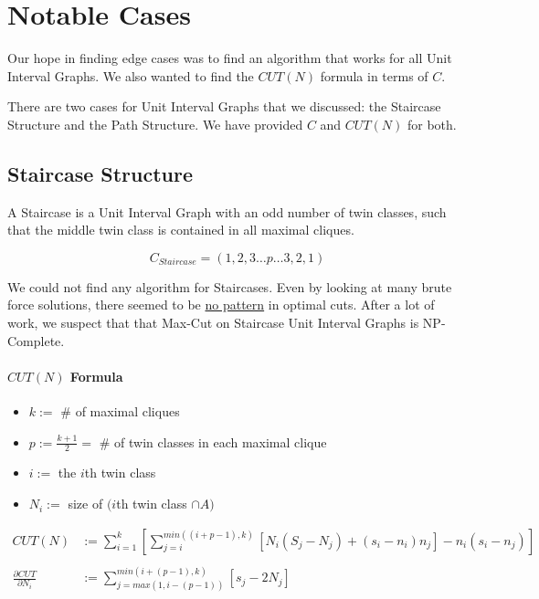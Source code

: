 \documentclass[12pt]{article}
\begin{document}
\section{Notable Cases}
Our hope in finding edge cases was to find an algorithm that works for all Unit Interval Graphs. We also wanted to find the $CUT(N)$ formula in terms of $C$.

There are two cases for Unit Interval Graphs that we discussed: the Staircase Structure and the Path Structure. We have provided $C$ and $CUT(N)$ for both.

\pagebreak


\subsection{Staircase Structure}
A Staircase is a Unit Interval Graph with an odd number of twin classes, such that the middle twin class is contained in all maximal cliques.

$$C_{Staircase} = (1, 2, 3 \ldots p \ldots 3, 2, 1)$$

We could not find any algorithm for Staircases. Even by looking at many brute force solutions, there seemed to be \underline{no pattern} in optimal cuts. After a lot of work, we suspect that that Max-Cut on Staircase Unit Interval Graphs is NP-Complete.

\paragraph{$CUT(N)$ Formula} \leavevmode

\begin{itemize}
    \item $k :=$ \# of maximal cliques
    \item $p := \frac{k+1}{2} = $ \# of twin classes in each maximal clique
    \item $i :=$ the $i$th twin class
    \item $N_i :=$ size of $(i$th twin class $\cap A)$
\end{itemize}
\begin{align}
    CUT(N) &:= \sum_{i=1}^{k} \left[ \sum_{j=i}^{min((i+p-1), k)} \left[ N_i(S_j - N_j) + (s_i - n_i)n_j \right] - n_i (s_i - n_j) \right] \nonumber \\
    \nonumber \\
    \frac{\partial CUT}{\partial N_i} &:= \sum_{ j=max( 1, i-(p-1) ) }^{ min( i+(p-1), k ) } \left[ s_j - 2N_j \right] \nonumber
\end{align}
\end{document}
